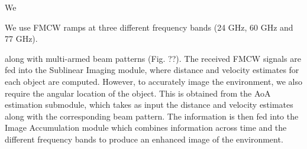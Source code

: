 We 



We use FMCW
ramps at three different frequency bands (24 GHz, 60 GHz and 77 GHz).




along with multi-armed beam patterns (Fig. ??). The received FMCW signals are fed into the Sublinear Imaging module, where distance and velocity estimates for each object are computed. However, to accurately image the environment, we also require the angular location of the object. This is obtained from the AoA estimation submodule, which takes as input the distance and velocity estimates along with the corresponding beam pattern.
The information is then fed into the Image Accumulation module which combines information across time and the different frequency bands to produce an enhanced image of the environment.

\fi

\iffalse
 reflected signals are received and the ToF of signals can be estimated} ramps

of the environment by obtaining the distances along with the angle 


\footnote{FMCW is a technique where the frequency of the transmitted signal is modulated such that the reflected signals are received and the ToF of signals can be estimated}
\fi

\iffalse

ToF of signal can be estimated from the received signal

sublinear beamforming
velocity
specularity
resolution
\fi




